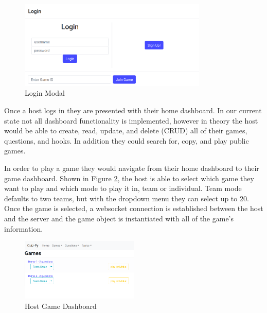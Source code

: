 \documentclass{article}
\begin{document}
            \begin{figure}[ht]
                \centering
                \includegraphics[width=0.8\textwidth]{images/frontend-login.png}
                \caption{Login Modal}
                \label{fig:frontend-login}
            \end{figure}
            
            Once a host logs in they are presented with their home dashboard. In our current state not all dashboard functionality is implemented, however in theory the host would be able to create, read, update, and delete (CRUD) all of their games, questions, and hooks. In addition they could search for, copy, and play public games.
            \smallskip
            
            In order to play a game they would navigate from their home dashboard to their game dashboard. Shown in Figure \ref{fig:frontend-games_dashboard}, the host is able to select which game they want to play and which mode to play it in, team or individual. Team mode defaults to two teams, but with the dropdown menu they can select up to 20. Once the game is selected, a websocket connection is established between the host and the server and the game object is instantiated with all of the game's information.  
            
            \begin{figure}[H]
                \centering
                \includegraphics[width=0.5\textwidth]{images/frontend-games_dashboard.png}
                \caption{Host Game Dashboard}
                \label{fig:frontend-games_dashboard}
            \end{figure}
            
\end{document}
